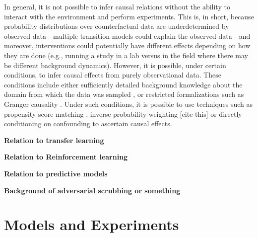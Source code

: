 \documentclass{article}
\begin{document}
In general, it is not possible to infer causal relations without the ability to interact with the environment and perform experiments. This is, in short, because probability distributions over counterfactual data are underdetermined by observed data - multiple transition models could explain the observed data - and moreover, interventions could potentially have different effects depending on how they are done (e.g., running a study in a lab versus in the field where there may be different background dynamics). However, it is possible, under certain conditions, to infer causal effects from purely observational data. These conditions include either sufficiently detailed background knowledge about the domain from which the data was sampled \cite{Pearl2009} \cite{Rosenbaum1983}, or restricted formalizations such as Granger causality \cite{granger1969investigating} \cite{granger1980testing}. Under such conditions, it is possible to use techniques such as propensity score matching \cite{Rosenbaum1983}, inverse probability weighting [cite this] or directly conditioning on confounding to ascertain causal effects.

\textbf{Relation to transfer learning}



\textbf{Relation to Reinforcement learning}




\textbf{Relation to predictive models}



\textbf{Background of adversarial scrubbing or something}



\section{Models and Experiments}

\end{document}
